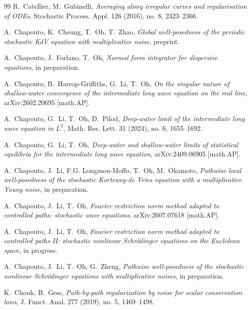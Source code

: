 \documentclass[letterpaper, 11pt,  reqno]{amsart}
\newcommand{\1}{\hspace{0.5mm}\textup{I}\hspace{0.5mm}}
\numberwithin{equation}{section}
\numberwithin{theorem}{section}
\begin{document}
\begin{thebibliography}{99}
R.~Catellier, M.~Gubinelli, 
{\it Averaging along irregular curves and regularisation of ODEs}, 
Stochastic Process. Appl. 126 (2016), no. 8, 2323--2366. 




A.~Chapouto, K.~Cheung, T.~Oh,
T.~Zhao, 
{\it Global well-posedness of the periodic stochastic KdV equation
with multiplicative noise}, 
preprint.




A.~Chapouto, J.~Forlano,  T.~Oh, 
{\it Normal form integrator for dispersive equations},
in preparation.


A.~Chapouto, B.~Harrop-Griffiths, G.~Li, T.~Oh,
{\it 
On the singular nature of shallow-water convergence of the intermediate long wave equation on the real line},
arXiv:2602.20695 [math.AP].

A.~Chapouto, G.~Li, T.~Oh, D.~Pilod,
{\it Deep-water limit of the intermediate long wave equation in $L^2$},
Math. Res. Lett.
 31 (2024), no. 6, 1655--1692. 






A.~Chapouto, G.~Li, T.~Oh, 
{\it
Deep-water and shallow-water limits
of statistical equilibria
for the intermediate long wave equation}, 
arXiv:2409.06905 [math.AP].


A.~Chapouto, J.~Li, 
F.G. Longmou-Moffo, 
T.~Oh, M.~Okamoto,
{\it Pathwise local well-posedness of the stochastic Korteweg-de Vries equation with a multiplicative Young noise}, in preparation. 



A.~Chapouto, J.~Li, T.~Oh, 
{\it  Fourier restriction norm method adapted to controlled paths:
stochastic wave equations},
arXiv:2607.07618 [math.AP].


A.~Chapouto, J.~Li, T.~Oh, 
{\it Fourier restriction norm method adapted to controlled paths II: stochastic
nonlinear Schr\"odinger equations on the Euclidean space}, in progress.


A.~Chapouto, J.~Li, T.~Oh, G.~Zheng,
{\it  Pathwise well-posedness of the stochastic nonlinear Schr\"odinger equations with multiplicative noises},
in preparation.


K.~Chouk, B.~Gess, 
{\it Path-by-path regularization by noise for scalar conservation laws}, 
J. Funct. Anal. 277 (2019), no. 5, 1469--1498. 





\end{thebibliography}
\end{document}
